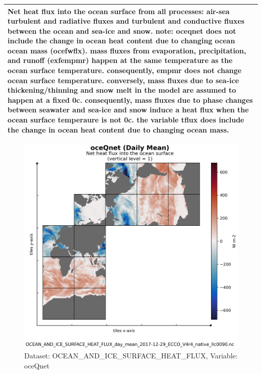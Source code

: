 \begin{longtable}{|m{}|m{}|m{}|m{}|}
\multicolumn{4}{|p{1\textwidth}|}{\footnotesize{{Net heat flux into the ocean surface from all processes: air-sea turbulent and radiative fluxes and turbulent and conductive fluxes between the ocean and sea-ice and snow. note: oceqnet does not include the change in ocean heat content due to changing ocean ocean mass (ocefwflx). mass fluxes from evaporation, precipitation, and runoff (exfempmr) happen at the same temperature as the ocean surface temperature. consequently, empmr does not change ocean surface temperature. conversely, mass fluxes due to sea-ice thickening/thinning and snow melt in the model are assumed to happen at a fixed 0c. consequently, mass fluxes due to phase changes between seawater and sea-ice and snow induce a heat flux when the ocean surface temperaure is not 0c. the variable tflux does include the change in ocean heat content due to changing ocean mass.}}} \\ \hline
\end{longtable}

\begin{figure}[H]
\centering
\includegraphics[scale=0.55]{../images/plots/v4r4/native_plots/Ocean_and_Sea-Ice_Surface_Heat_Fluxes/oceQnet.png}
\caption{Dataset: OCEAN\_AND\_ICE\_SURFACE\_HEAT\_FLUX, Variable: oceQnet}
\label{tab:table-OCEAN_AND_ICE_SURFACE_HEAT_FLUX_oceQnet-Plot}
\end{figure}
\newpage
\pagebreak
